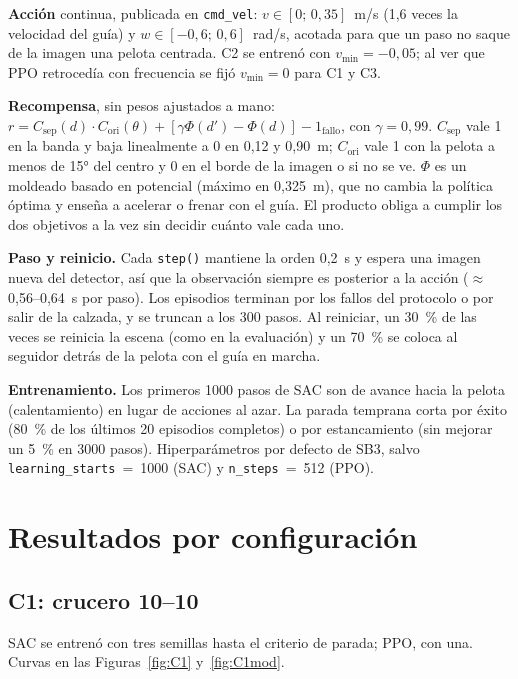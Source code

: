 \documentclass[11pt,a4paper]{article}
\newcommand{\cod}[1]{\texttt{\small #1}}
\begin{document}
\textbf{Acción} continua, publicada en \cod{cmd\_vel}: $v\in[0;\,0{,}35]$~m/s (1,6 veces la velocidad del guía) y
$w\in[-0{,}6;\,0{,}6]$~rad/s, acotada para que un paso no saque de la imagen una pelota centrada. C2 se entrenó
con $v_{\min}=-0{,}05$; al ver que PPO retrocedía con frecuencia se fijó $v_{\min}=0$ para C1 y C3.

\textbf{Recompensa}, sin pesos ajustados a mano:
$r = C_{\text{sep}}(d)\cdot C_{\text{ori}}(\theta) + [\gamma\Phi(d')-\Phi(d)] - 1_{\text{fallo}}$, con
$\gamma=0{,}99$. $C_{\text{sep}}$ vale 1 en la banda y baja linealmente a 0 en 0,12 y 0,90~m; $C_{\text{ori}}$
vale 1 con la pelota a menos de 15° del centro y 0 en el borde de la imagen o si no se ve. $\Phi$ es un
moldeado basado en potencial (máximo en 0,325~m), que no cambia la política óptima y enseña a acelerar o frenar
con el guía. El producto obliga a cumplir los dos objetivos a la vez sin decidir cuánto vale cada uno.

\textbf{Paso y reinicio.} Cada \cod{step()} mantiene la orden 0,2~s y espera una imagen nueva del detector, así
que la observación siempre es posterior a la acción ($\approx$0,56--0,64~s por paso). Los episodios terminan por
los fallos del protocolo o por salir de la calzada, y se truncan a los 300 pasos. Al reiniciar, un 30~\% de las
veces se reinicia la escena (como en la evaluación) y un 70~\% se coloca al seguidor detrás de la pelota con el
guía en marcha.

\textbf{Entrenamiento.} Los primeros 1000 pasos de SAC son de avance hacia la pelota (calentamiento) en lugar de
acciones al azar. La parada temprana corta por éxito (80~\% de los últimos 20 episodios completos) o por
estancamiento (sin mejorar un 5~\% en 3000 pasos). Hiperparámetros por defecto de SB3, salvo
\cod{learning\_starts}~=~1000 (SAC) y \cod{n\_steps}~=~512 (PPO).

\section{Resultados por configuración}

\subsection{C1: crucero 10--10}
SAC se entrenó con tres semillas hasta el criterio de parada; PPO, con una. Curvas en las
Figuras~\ref{fig:C1} y~\ref{fig:C1mod}.
\end{document}

